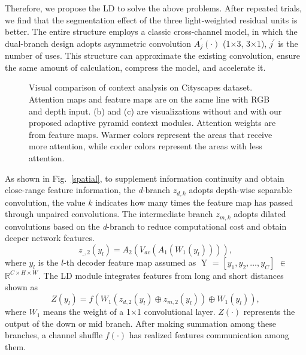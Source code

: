 \documentclass[journal,twoside,web]{ieeecolor}
\begin{document}
Therefore, we propose the LD to solve the above problems. After repeated trials, we find that the segmentation effect of the three light-weighted residual units is better. The entire structure employs a classic cross-channel model, in which the dual-branch design adopts asymmetric convolution ${A_j^{\prime}}\left(  \cdot  \right)$ (1$\times$3, 3$\times$1), $j^{\prime}$ is the number of uses. This structure can approximate the existing convolution, ensure the same amount of calculation, compress the model, and accelerate it. 
\begin{figure}[!t]
	\centering
	\hspace{-0.5em}
	\hspace{-0.5em}
	\caption{Visual comparison of context analysis on Cityscapes dataset. Attention maps and feature maps are on the same line with RGB and depth input. (b) and (c) are visualizations without and with our proposed adaptive pyramid context modules. Attention weights are from feature maps. Warmer colors represent the areas that receive more attention, while cooler colors represent the areas with less attention.}
	\label{context}
\end{figure}
As shown in Fig.~\ref{spatial}, to supplement information continuity and obtain close-range feature information, the \textit{d}-branch ${z_{d,k}}$ adopts depth-wise separable convolution, the value $k$ indicates how many times the feature map has passed through unpaired convolutions. The intermediate branch ${z_{m,k}}$ adopts dilated convolutions based on the \textit{d}-branch to reduce computational cost and obtain deeper network features. 
\begin{equation}
	{z_{\_,2}}\left( {{y_l}} \right) = {A_2}\left( {{V_{ac}}\left( {{A_1}\left( {{W_1}\left( {{y_l}} \right)} \right)} \right)} \right),
\end{equation}
where ${y_l}$ is the $l$-th decoder feature map assumed as $\mathop Y$ = $\left[ {{y_1},{y_2}, \ldots ,{y_C}} \right]$ $\in$ ${\mathbb{R}^{C \times H \times W}}$. The LD module integrates features from long and short distances shown as
\begin{equation}
Z\left( {{y_l}} \right) = f\left( {{W_1}\left( {{z_{d,2}}\left( {{y_l}} \right) \oplus {z_{m,2}}\left( {{y_l}} \right)} \right) \oplus {W_1}\left( {{y_l}} \right)} \right),
\end{equation}
where ${W_{1}}$ means the weight of a 1$\times$1 convolutional layer. $Z\left(  \cdot  \right)$ represents the output of the down or mid branch. After making summation among these branches, a channel shuffle $f\left(  \cdot  \right)$  has realized features communication among them.
\end{document}
